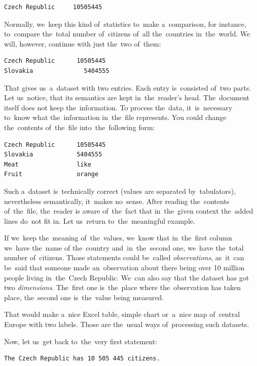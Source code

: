 \begin{verbatim}
Czech Republic     10505445
\end{verbatim}

Normally, we~keep this kind of~statistics to~make a~comparison, 
for instance, to~compare the~total number of~citizens of~all the~countries in~the~world.
We will, however, continue with just the~two of~them:

\begin{verbatim}
Czech Republic	    10505445
Slovakia	          5404555
\end{verbatim}

That gives us~a~dataset with two entries. Each entry is~consisted of~two parts. Let us~notice, that 
its semantics are kept in~the~reader's head. The~document itself does not keep the~information.
To process the~data, it~is~necessary to~know what the~information in~the~file represents. You could change
the~contents of~the~file into~the~following form:

\begin{verbatim}
Czech Republic      10505445
Slovakia            5404555
Meat                like
Fruit               orange
\end{verbatim}

Such a~dataset is~technically correct (values are separated by~tabulators), nevertheless 
semantically, it~makes no~sense. After reading the~contents of~the~file, the~reader 
is aware of~the~fact that in~the~given context the~added lines do~not fit in.
Let us~return to~the~meaningful example.

If we~keep the~meaning of~the~values, we~know that in~the~first column we~have the~name
of the~country and~in~the~second one, we~have the~total number of~citizens. Those statements
could be~called \emph{observations}, as~it~can be~said that someone made an~observation 
about there being over 10 million people living in~the~Czech Republic. We~can also say that the
dataset has got two \emph{dimensions}. The~first one is~the~place where the~observation has taken
place, the~second one is~the~value being measured.

That would make a~nice Excel table, simple chart or~a~nice map of~central Europe with
two labels. Those are the~usual ways of~processing such datasets.

Now, let us~get back to~the~very first statement:

\begin{verbatim}
The Czech Republic has 10 505 445 citizens.
\end{verbatim}

